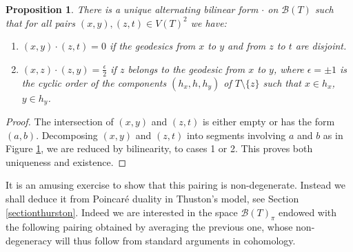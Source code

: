 \documentclass{amsart}
\newtheorem{proposition}{Proposition}
\newcommand{\Bb}{\mathcal{B}}
\begin{document}
\begin{proposition}\label{prop-pairing}
There is a unique alternating bilinear form $\cdot$ on $\Bb(T)$ such that for all pairs $(x,y),(z,t)\in V(T)^2$ we have:
\begin{enumerate}
    \item $(x,y)\cdot(z,t)=0$ if the geodesics from $x$ to $y$ and from $z$ to $t$ are disjoint.
    \item $(x,z)\cdot(z,y) =\frac \epsilon 2$ if $z$ belongs to the geodesic from $x$ to $y$, where $\epsilon= \pm 1$ is the cyclic order of the components $(h_x, h, h_y)$ of $T\setminus\{z\}$ such that $x\in h_x$, $y\in h_y$. %
\end{enumerate}
\end{proposition}
\begin{proof}
The intersection of $(x,y)$ and $(z,t)$ is either empty or has the form $(a,b)$. Decomposing $(x,y)$ and $(z,t)$ into segments involving $a$ and $b$ as in Figure \ref{fig:inter-cycles}, we are reduced by bilinearity, to cases 1 or 2. This proves both uniqueness and existence. 
\end{proof}
\begin{figure}[htbp]
    \centering
    \def\svgwidth{8cm}
    
    \caption{}
    \label{fig:inter-cycles}
\end{figure}
It is an amusing exercise to show that this pairing is non-degenerate. Instead we shall deduce it from Poincaré duality in Thuston's model, see Section \ref{sectionthurston}. %
Indeed we are interested in the space $\Bb(T)_\pi$ endowed with the following pairing obtained by averaging the previous one, whose non-degeneracy will thus follow from standard arguments in cohomology.
\end{document}
